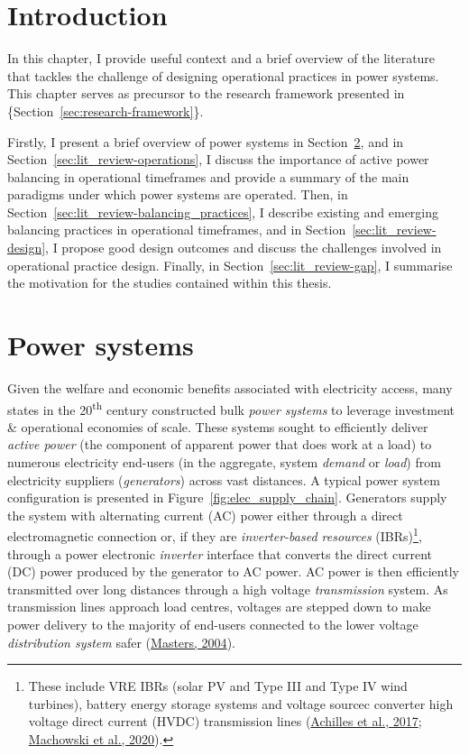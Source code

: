 \documentclass[12pt,a4paper,]{report}
\begin{document}
\hypertarget{introduction}{%
\section{Introduction}\label{introduction}}

In this chapter, I provide useful context and a brief overview of the
literature that tackles the challenge of designing operational practices
in power systems. This chapter serves as precursor to the research
framework presented in \{Section~\ref{sec:research-framework}\}.

Firstly, I present a brief overview of power systems in
Section~\ref{sec:lit_review-power_systems}, and in
Section~\ref{sec:lit_review-operations}, I discuss the importance of
active power balancing in operational timeframes and provide a summary
of the main paradigms under which power systems are operated. Then, in
Section~\ref{sec:lit_review-balancing_practices}, I describe existing
and emerging balancing practices in operational timeframes, and in
Section~\ref{sec:lit_review-design}, I propose good design outcomes and
discuss the challenges involved in operational practice design. Finally,
in Section~\ref{sec:lit_review-gap}, I summarise the motivation for the
studies contained within this thesis.

\hypertarget{sec:lit_review-power_systems}{%
\section{Power systems}\label{sec:lit_review-power_systems}}

Given the welfare and economic benefits associated with electricity
access, many states in the 20\textsuperscript{th} century constructed
bulk \emph{power systems} to leverage investment \& operational
economies of scale. These systems sought to efficiently deliver
\emph{active power} (the component of apparent power that does work at a
load) to numerous electricity end-users (in the aggregate, system
\emph{demand} or \emph{load}) from electricity suppliers
(\emph{generators}) across vast distances. A typical power system
configuration is presented in Figure~\ref{fig:elec_supply_chain}.
Generators supply the system with alternating current (AC) power either
through a direct electromagnetic connection or, if they are
\emph{inverter-based resources} (IBRs)\footnote{These include VRE IBRs
  (solar PV and Type III and Type IV wind turbines), battery energy
  storage systems and voltage sourcec converter high voltage direct
  current (HVDC) transmission lines
  (\protect\hyperlink{ref-achillesIntegratingInverterBasedResources2017}{Achilles
  et al., 2017};
  \protect\hyperlink{ref-machowskiPowerSystemDynamics2020}{Machowski et
  al., 2020}).}, through a power electronic \emph{inverter} interface
that converts the direct current (DC) power produced by the generator to
AC power. AC power is then efficiently transmitted over long distances
through a high voltage \emph{transmission} system. As transmission lines
approach load centres, voltages are stepped down to make power delivery
to the majority of end-users connected to the lower voltage
\emph{distribution system} safer
(\protect\hyperlink{ref-mastersRenewableEfficientElectric2004}{Masters,
2004}).
\end{document}
